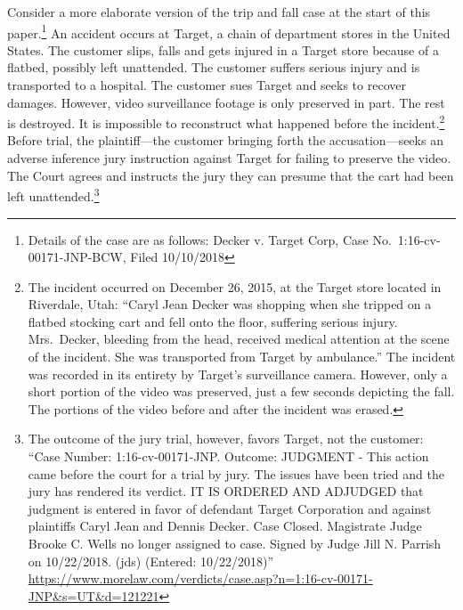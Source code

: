 \documentclass[
  10pt,
  dvipsnames,enabledeprecatedfontcommands]{scrartcl}
\begin{document}
Consider a more elaborate version of the trip and fall case at the start
of this paper.\footnote{Details of the case are as follows: Decker v.
  Target Corp, Case No.~1:16-cv-00171-JNP-BCW, Filed 10/10/2018} An
accident occurs at Target, a chain of department stores in the United
States. The customer slips, falls and gets injured in a Target store
because of a flatbed, possibly left unattended. The customer suffers
serious injury and is transported to a hospital. The customer sues
Target and seeks to recover damages. However, video surveillance footage
is only preserved in part. The rest is destroyed. It is impossible to
reconstruct what happened before the incident.\footnote{The incident
  occurred on December 26, 2015, at the Target store located in
  Riverdale, Utah: ``Caryl Jean Decker was shopping when she tripped on
  a flatbed stocking cart and fell onto the floor, suffering serious
  injury. Mrs.~Decker, bleeding from the head, received medical
  attention at the scene of the incident. She was transported from
  Target by ambulance.'' The incident was recorded in its entirety by
  Target's surveillance camera. However, only a short portion of the
  video was preserved, just a few seconds depicting the fall. The
  portions of the video before and after the incident was erased.}
Before trial, the plaintiff---the customer bringing forth the
accusation---seeks an adverse inference jury instruction against Target
for failing to preserve the video. The Court agrees and instructs the
jury they can presume that the cart had been left unattended.\footnote{The
  outcome of the jury trial, however, favors Target, not the customer:
  ``Case Number: 1:16-cv-00171-JNP. Outcome: JUDGMENT - This action came
  before the court for a trial by jury. The issues have been tried and
  the jury has rendered its verdict. IT IS ORDERED AND ADJUDGED that
  judgment is entered in favor of defendant Target Corporation and
  against plaintiffs Caryl Jean and Dennis Decker. Case Closed.
  Magistrate Judge Brooke C. Wells no longer assigned to case. Signed by
  Judge Jill N. Parrish on 10/22/2018. (jds) (Entered: 10/22/2018)''
  \url{https://www.morelaw.com/verdicts/case.asp?n=1:16-cv-00171-JNP\&s=UT\&d=121221}}
\end{document}
